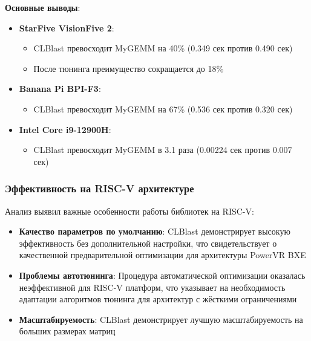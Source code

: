 \textbf{Основные выводы}:

\begin{itemize}
    \item \textbf{StarFive VisionFive 2}:
    \begin{itemize}
        \item CLBlast превосходит MyGEMM на 40\% (0.349 сек против 0.490 сек)
        \item После тюнинга преимущество сокращается до 18\%
    \end{itemize}
    
    \item \textbf{Banana Pi BPI-F3}:
    \begin{itemize}
        \item CLBlast превосходит MyGEMM на 67\% (0.536 сек против 0.320 сек)
    \end{itemize}
    
    \item \textbf{Intel Core i9-12900H}:
    \begin{itemize}
        \item CLBlast превосходит MyGEMM в 3.1 раза (0.00224 сек против 0.007 сек)
    \end{itemize}
\end{itemize}

\subsubsection{Эффективность на RISC-V архитектуре}

Анализ выявил важные особенности работы библиотек на RISC-V:

\begin{itemize}
    \item \textbf{Качество параметров по умолчанию}: CLBlast демонстрирует высокую эффективность без дополнительной настройки, что свидетельствует о качественной предварительной оптимизации для архитектуры PowerVR BXE
    
    \item \textbf{Проблемы автотюнинга}: Процедура автоматической оптимизации оказалась неэффективной для RISC-V платформ, что указывает на необходимость адаптации алгоритмов тюнинга для архитектур с жёсткими ограничениями
    
    \item \textbf{Масштабируемость}: CLBlast демонстрирует лучшую масштабируемость на больших размерах матриц
\end{itemize}

